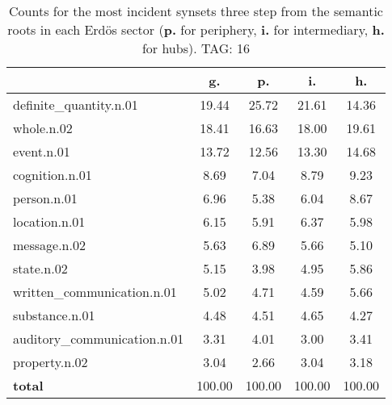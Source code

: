 \begin{table}[h!]
\begin{center}
\begin{tabular}{| l || c | c | c | c |}\hline
 & {\bf g.} & {\bf p.} & {\bf i.} & {\bf h.} \\\hline\hline
definite\_quantity.n.01 & 19.44  & 25.72  & 21.61  & 14.36 \\\hline
whole.n.02 & 18.41  & 16.63  & 18.00  & 19.61 \\\hline
event.n.01 & 13.72  & 12.56  & 13.30  & 14.68 \\\hline
cognition.n.01 & 8.69  & 7.04  & 8.79  & 9.23 \\\hline
person.n.01 & 6.96  & 5.38  & 6.04  & 8.67 \\\hline
location.n.01 & 6.15  & 5.91  & 6.37  & 5.98 \\\hline
message.n.02 & 5.63  & 6.89  & 5.66  & 5.10 \\\hline
state.n.02 & 5.15  & 3.98  & 4.95  & 5.86 \\\hline
written\_communication.n.01 & 5.02  & 4.71  & 4.59  & 5.66 \\\hline
substance.n.01 & 4.48  & 4.51  & 4.65  & 4.27 \\\hline
auditory\_communication.n.01 & 3.31  & 4.01  & 3.00  & 3.41 \\\hline
property.n.02 & 3.04  & 2.66  & 3.04  & 3.18 \\\hline\hline
{{\bf total}} & 100.00  & 100.00  & 100.00  & 100.00 \\\hline
\end{tabular}
\caption{Counts for the most incident synsets three step from the semantic roots in each Erd\"os sector ({\bf p.} for periphery, {\bf i.} for intermediary, {\bf h.} for hubs). TAG: 16}
\end{center}
\end{table}